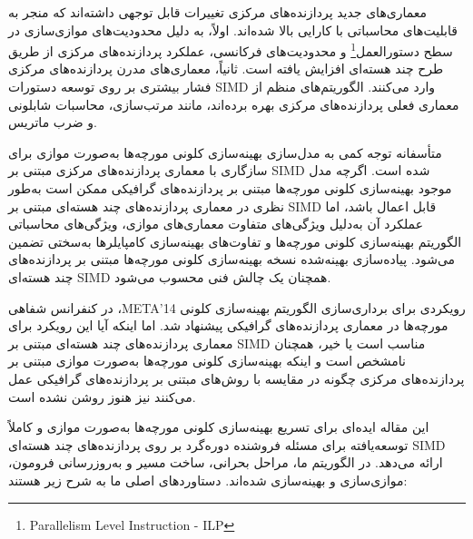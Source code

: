 \documentclass[a4paper,10pt]{article}
\begin{document}
        معماری‌های جدید پردازنده‌های مرکزی تغییرات قابل توجهی داشته‌اند که منجر به قابلیت‌های محاسباتی با کارایی بالا شده‌اند. اولاً، به دلیل محدودیت‌های موازی‌سازی در سطح دستورالعمل\footnote{\hspace{2pt}Parallelism Level Instruction - ILP} و محدودیت‌های فرکانسی، عملکرد پردازنده‌های مرکزی از طریق طرح چند هسته‌ای افزایش یافته است. ثانیاً، معماری‌های مدرن پردازنده‌های مرکزی فشار بیشتری بر روی توسعه دستورات SIMD وارد می‌کنند. الگوریتم‌های منظم از معماری فعلی پردازنده‌های مرکزی بهره برده‌اند، مانند مرتب‌سازی، محاسبات شابلونی و ضرب ماتریس.

        متأسفانه توجه کمی به مدل‌سازی بهینه‌سازی کلونی مورچه‌ها به‌صورت موازی برای سازگاری با معماری پردازنده‌های مرکزی مبتنی بر SIMD شده است. اگرچه مدل موجود بهینه‌سازی کلونی مورچه‌ها مبتنی بر پردازنده‌های گرافیکی ممکن است به‌طور نظری در معماری پردازنده‌های چند هسته‌ای مبتنی بر SIMD قابل اعمال باشد، اما عملکرد آن به‌دلیل ویژگی‌های متفاوت معماری‌های موازی، ویژگی‌های محاسباتی الگوریتم بهینه‌سازی کلونی مورچه‌ها و تفاوت‌های بهینه‌سازی کامپایلرها به‌سختی تضمین می‌شود. پیاده‌سازی بهینه‌شده نسخه بهینه‌سازی کلونی مورچه‌ها مبتنی بر پردازنده‌های چند هسته‌ای SIMD همچنان یک چالش فنی محسوب می‌شود.

        در کنفرانس شفاهی ،META’14 رویکردی برای برداری‌سازی الگوریتم بهینه‌سازی کلونی مورچه‌ها در معماری پردازنده‌های گرافیکی پیشنهاد شد. اما اینکه آیا این رویکرد برای معماری پردازنده‌های چند هسته‌ای مبتنی بر SIMD مناسب است یا خیر، همچنان نامشخص است و اینکه بهینه‌سازی کلونی مورچه‌ها به‌صورت موازی مبتنی بر پردازنده‌های مرکزی چگونه در مقایسه با روش‌های مبتنی بر پردازنده‌های گرافیکی عمل می‌کنند نیز هنوز روشن نشده است.

        این مقاله ایده‌ای برای تسریع بهینه‌سازی کلونی مورچه‌ها به‌صورت موازی و کاملاً توسعه‌یافته برای مسئله فروشنده دوره‌گرد بر روی پردازنده‌های چند هسته‌ای SIMD ارائه می‌دهد. در الگوریتم ما، مراحل بحرانی، ساخت مسیر و به‌روزرسانی فرومون، موازی‌سازی و بهینه‌سازی شده‌اند. دستاوردهای اصلی ما به شرح زیر هستند:
\end{document}
